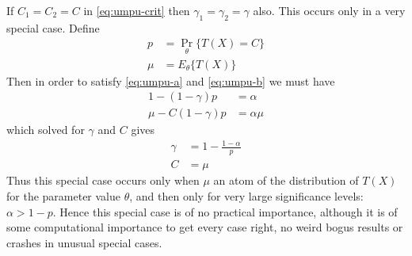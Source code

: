 \documentclass{article}
\DeclareMathOperator{\pr}{Pr}
\begin{document}
If $C_1 = C_2 = C$ in \eqref{eq:umpu-crit} then $\gamma_1 = \gamma_2 = \gamma$
also.  This occurs only in a very special case.
Define
\begin{subequations}
\begin{align}
   p & = \pr_\theta\{T(X) = C\}
   \label{eq:p}
   \\
   \mu & = E_\theta\{T(X)\}
   \label{eq:mu}
\end{align}
\end{subequations}
Then in order to satisfy \eqref{eq:umpu-a} and \eqref{eq:umpu-b} we must have
\begin{align*}
   1 - (1 - \gamma) p & = \alpha
   \\
   \mu - C (1 - \gamma) p & = \alpha \mu
\end{align*}
which solved for $\gamma$ and $C$ gives
\begin{subequations}
\begin{align}
   \gamma & = 1 - \frac{1 - \alpha}{p}
   \label{eq:umpu-spec-a}
   \\
   C & = \mu
   \label{eq:umpu-spec-b}
\end{align}
\end{subequations}
Thus this special case occurs only when $\mu$
an atom of the distribution of $T(X)$ for the parameter value $\theta$,
and then only for
very large significance levels: $\alpha > 1 - p$.
Hence this special case is of no practical importance,
although
it is of some computational importance to get every case right, no weird
bogus results or crashes in unusual special cases.
\end{document}
